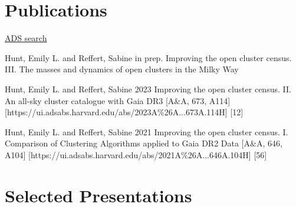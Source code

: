 \documentclass[12pt, letterpaper]{hunt-cv}
\begin{document}



\section*{Publications}

\href{\cvADSLink}{ADS search \faLink}


\begin{etaremune}
    \item \publication
        {Hunt, Emily L. and Reffert, Sabine}
        {in prep.}
        {Improving the open cluster census. III. The masses and dynamics of open clusters in the Milky Way}
    \item \publication
        {Hunt, Emily L. and Reffert, Sabine}
        {2023}
        {Improving the open cluster census. II. An all-sky cluster catalogue with Gaia DR3}
        [A\&A, 673, A114]
        [https://ui.adsabs.harvard.edu/abs/2023A\%26A...673A.114H]
        [12]
    \item \publication
        {Hunt, Emily L. and Reffert, Sabine}
        {2021}
        {Improving the open cluster census. I. Comparison of Clustering Algorithms applied to Gaia DR2 Data}
        [A\&A, 646, A104]
        [https://ui.adsabs.harvard.edu/abs/2021A\%26A...646A.104H]
        [56]
\end{etaremune}


\section*{Selected Presentations}
\end{document}
